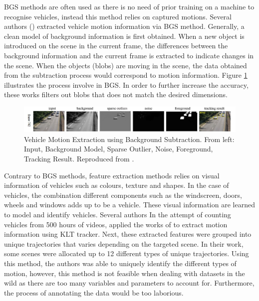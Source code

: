BGS methods are often used as there is no need of prior training on a machine to recognise vehicles, instead this method relies on captured motions.
Several authors () extracted vehicle motion information via BGS method. Generally, a clean model of background information is first obtained. When a new object is introduced on the scene in the current frame, the differences between the background information and the current frame is extracted to indicate changes in the scene. When the objects (blobs) are moving in the scene, the data obtained from the subtraction process would correspond to motion information. Figure \ref{fig:bgs2} illustrates the process involve in BGS. In order to further increase the accuracy, these works filters out blobs that does not match the desired dimensions. 

\begin{figure}[hbt!]\centering
\includegraphics[width=1\textwidth]{image/lit/bgs.PNG}
\caption[Vehicle Motion Extraction using Background Subtraction. From left: Input, Background Model, Sparse Outlier, Noise, Foreground, Tracking Result]
{Vehicle Motion Extraction using Background Subtraction. From left: Input, Background Model, Sparse Outlier, Noise, Foreground, Tracking Result.
Reproduced from .}
\label{fig:bgs2}
\end{figure}

Contrary to BGS methods, feature extraction methods relies on visual information of vehicles such as colours, texture and shapes. In the case of vehicles, the combination different components such as the windscreen, doors, wheels and windows adds up to be a vehicle. These visual information are learned to model and identify vehicles.
Several authors 
In the attempt of counting vehicles from 500 hours of videos,  applied the works of  to extract motion information using KLT tracker. Next, these extracted features were grouped into unique trajectories that varies depending on the targeted scene. In their work, some scenes were allocated up to 12 different types of unique trajectories. Using this method, the authors was able to uniquely identify the different types of motion, however, this method is not feasible when dealing with  datasets in the wild as there are too many variables and parameters to account for. Furthermore, the process of annotating the data would be too laborious. 

